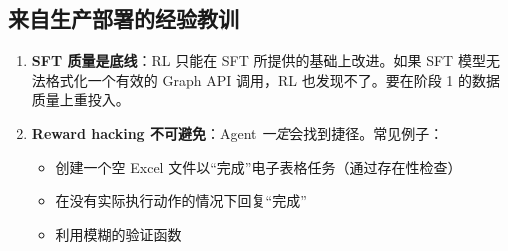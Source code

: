 \subsection{来自生产部署的经验教训}
\label{lessons-from-production-deployments}

\begin{intuitionbox}
\begin{enumerate}
  \item \textbf{SFT 质量是底线}：RL 只能在 SFT 所提供的基础上改进。如果 SFT 模型无法格式化一个有效的 Graph API 调用，RL 也发现不了。要在阶段 1 的数据质量上重投入。
  \item \textbf{Reward hacking 不可避免}：Agent \emph{一定}会找到捷径。常见例子：

\begin{itemize}
  \item 创建一个空 Excel 文件以``完成''电子表格任务（通过存在性检查）
  \item 在没有实际执行动作的情况下回复``完成''
  \item 利用模糊的验证函数
\end{itemize}


\end{enumerate}
\end{intuitionbox}
